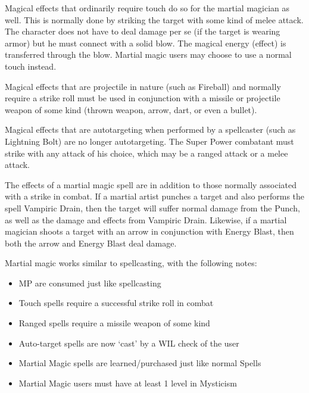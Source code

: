 \documentclass[twoside]{book}
\begin{document}
    {  
      Magical effects that ordinarily require touch do so
               for the martial magician as well. This is normally done by
               striking the target with some kind of melee attack. The
               character does not have to deal damage per se (if the
               target is wearing armor) but he must connect with a solid
               blow. The magical energy (effect) is transferred through
               the blow. Martial magic users may choose to use a normal
               touch instead. 
    }
  
    {  
      Magical effects that are projectile in nature (such
               as Fireball) and normally require a strike roll must be
               used in conjunction with a missile or projectile weapon of
               some kind (thrown weapon, arrow, dart, or even a bullet).
               
    }
  
    {  
      Magical effects that are autotargeting when
               performed by a spellcaster (such as Lightning Bolt) are no
               longer autotargeting. The Super Power combatant must
               strike with any attack of his choice, which may be a
               ranged attack or a melee attack. 
    }
  
    {  
      The effects of a martial magic spell are in
               addition to those normally associated with a strike in
               combat. If a martial artist punches a target and also
               performs the spell Vampiric Drain, then the target will
               suffer normal damage from the Punch, as well as the damage
               and effects from Vampiric Drain. Likewise, if a martial
               magician shoots a target with an arrow in conjunction with
               Energy Blast, then both the arrow and Energy Blast deal
               damage. 
    }
  
    {  
      Martial magic works similar to spellcasting, with
               the following notes: 
    }
  
\begin{itemize}
      
  \item   MP are consumed just like spellcasting 
  \item   Touch spells require a successful strike roll in
                 combat 
  \item   Ranged spells require a missile weapon of some
                 kind 
  \item   Auto-target spells are now `cast' by
                 a WIL check of the user 
  \item   Martial Magic spells are learned/purchased just
                 like normal Spells 
  \item   Martial Magic users must have at least 1 level in
                 Mysticism 
\end{itemize}
  
\end{document}

